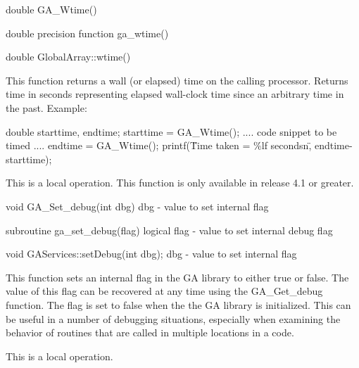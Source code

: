 \documentclass[12pt]{article}
\begin{document}

\begin{capi}
double GA_Wtime()
\end{capi}

\begin{fapi}
double precision function ga_wtime()
\end{fapi}

\begin{cxxapi}
double GlobalArray::wtime()
\end{cxxapi}

\begin{desc}

This function returns a wall (or elapsed) time on the calling processor. Returns time in seconds representing elapsed wall-clock time since an arbitrary time in the past. Example:

\begin{codeseg}
double starttime, endtime;
starttime = GA_Wtime();
.... code snippet to be timed ....
endtime   = GA_Wtime();
printf(\"Time taken = \%lf secondsn\", endtime-starttime);
\end{codeseg}

This is a local operation.
This function is only available in release 4.1 or greater.
\end{desc}


\begin{capi}
void GA_Set_debug(int dbg)
   dbg          - value to set internal flag                                   \access{[input]} 
\end{capi}

\begin{fapi}
subroutine ga_set_debug(flag)
   logical flag - value to set internal debug flag                             \access{[input]} 
\end{fapi}

\begin{cxxapi}
void GAServices::setDebug(int dbg);
   dbg          - value to set internal flag                                   \access{[input]} 
\end{cxxapi}

\begin{desc}

This function sets an internal flag in the GA library to either true or false. The value of this flag can be recovered at any time using the GA_Get_debug function. The flag is set to false when the the GA library is initialized. This can be useful in a number of debugging situations, especially when examining the behavior of routines that are called in multiple locations in a code.

This is a local operation.
\end{desc}
\end{document}

